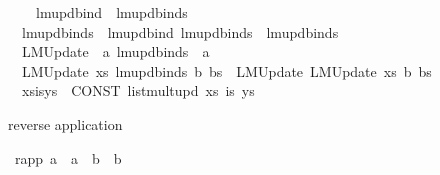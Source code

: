 \begin{isabellebody}
\ \ {\isachardoublequoteopen}{\isachardoublequoteclose}\ {\isacharcolon}{\isacharcolon}\ {\isachardoublequoteopen}lmupdbind\ {\isacharequal}{\isachargreater}\ lmupdbinds{\isachardoublequoteclose}\ \ \ \ {\isacharparenleft}{\isachardoublequoteopen}{\isacharunderscore}{\isachardoublequoteclose}{\isacharparenright}\isanewline
\ \ {\isachardoublequoteopen}{\isacharunderscore}lmupdbinds{\isachardoublequoteclose}\ {\isacharcolon}{\isacharcolon}\ {\isachardoublequoteopen}{\isacharbrackleft}lmupdbind{\isacharcomma}\ lmupdbinds{\isacharbrackright}\ {\isacharequal}{\isachargreater}\ lmupdbinds{\isachardoublequoteclose}\ \ \ \ {\isacharparenleft}{\isachardoublequoteopen}{\isacharunderscore}{\isacharcomma}{\isacharslash}\ {\isacharunderscore}{\isachardoublequoteclose}{\isacharparenright}\isanewline
\ \ {\isachardoublequoteopen}{\isacharunderscore}LMUpdate{\isachardoublequoteclose}\ {\isacharcolon}{\isacharcolon}\ {\isachardoublequoteopen}{\isacharbrackleft}{\isacharprime}a{\isacharcomma}\ lmupdbinds{\isacharbrackright}\ {\isacharequal}{\isachargreater}\ {\isacharprime}a{\isachardoublequoteclose}\ \ \ \ {\isacharparenleft}{\isachardoublequoteopen}{\isacharunderscore}{\isacharslash}{\isacharbrackleft}{\isacharparenleft}{\isacharunderscore}{\isacharparenright}{\isacharbrackright}{\isachardoublequoteclose}\ {\isacharbrackleft}{}{}{}{\isacharcomma}{}{\isacharbrackright}\ {}{}{}{\isacharparenright}\isanewline
\isanewline
{}\isamarkupfalse%
\isanewline
\ \ {\isachardoublequoteopen}{\isacharunderscore}LMUpdate\ xs\ {\isacharparenleft}{\isacharunderscore}lmupdbinds\ b\ bs{\isacharparenright}{\isachardoublequoteclose}\ {\isacharequal}{\isacharequal}\ {\isachardoublequoteopen}{\isacharunderscore}LMUpdate\ {\isacharparenleft}{\isacharunderscore}LMUpdate\ xs\ b{\isacharparenright}\ bs{\isachardoublequoteclose}\isanewline
\ \ {\isachardoublequoteopen}xs{\isacharbrackleft}is{\isacharbrackleft}{\isacharcolon}{\isacharequal}{\isacharbrackright}ys{\isacharbrackright}{\isachardoublequoteclose}\ {\isacharequal}{\isacharequal}\ {\isachardoublequoteopen}CONST\ list{\isacharunderscore}multupd\ xs\ is\ ys{\isachardoublequoteclose}%
\isamarkuptrue%
%
\begin{isamarkuptext}%
reverse application%
\end{isamarkuptext}\isamarkuptrue%
\isamarkupfalse%
\ rapp{\isacharcolon}{\isacharcolon}\ {\isachardoublequoteopen}{\isacharprime}a\ {\isasymRightarrow}\ {\isacharparenleft}{\isacharprime}a\ {\isasymRightarrow}\ {\isacharprime}b{\isacharparenright}\ {\isasymRightarrow}\ {\isacharprime}b{\isachardoublequoteclose}\ {\isacharparenleft}\ {\isachardoublequoteopen}{\isacharbar}{\isachargreater}{\isachardoublequoteclose}\ {}{}{\isacharparenright}\isanewline

\end{isabellebody}
